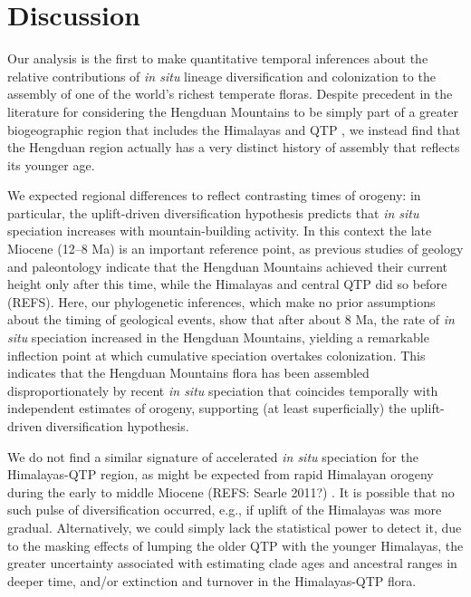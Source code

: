 \section{Discussion}

Our analysis is the first to make quantitative temporal inferences about the relative contributions of \textit{in situ} lineage diversification and colonization to the assembly of one of the world's richest temperate floras. Despite precedent in the literature for considering the Hengduan Mountains to be simply part of a greater biogeographic region that includes the Himalayas and QTP \citep[e.g.][]{Zhang2014,Nie2013,GaoY2013,Matuszak2016}, we instead find that the Hengduan region actually has a very distinct history of assembly that reflects its younger age.

We expected regional differences to reflect contrasting times of orogeny: in particular, the uplift-driven diversification hypothesis predicts that \textit{in situ} speciation increases with mountain-building activity. In this context the late Miocene (12--8 Ma) is an important reference point, as previous studies of geology and paleontology indicate that the Hengduan Mountains achieved their current height only after this time, while the Himalayas and central QTP did so before (REFS). Here, our phylogenetic inferences, which make no prior assumptions about the timing of geological events, show that after about 8 Ma, the rate of \textit{in situ} speciation increased in the Hengduan Mountains, yielding a remarkable inflection point at which cumulative speciation overtakes colonization. This indicates that the Hengduan Mountains flora has been assembled disproportionately by recent \textit{in situ} speciation that coincides temporally with independent estimates of orogeny, supporting (at least superficially) the uplift-driven diversification hypothesis.

We do not find a similar signature of accelerated \textit{in situ} speciation for the Himalayas-QTP region, as might be expected from rapid Himalayan orogeny during the early to middle Miocene (REFS: Searle 2011?)  %
. It is possible that no such pulse of diversification occurred, e.g., if uplift of the Himalayas was more gradual. Alternatively, we could simply lack the statistical power to detect it, due to the masking effects of lumping the older QTP with the younger Himalayas, the greater uncertainty associated with estimating clade ages and ancestral ranges in deeper time, and/or extinction and turnover in the Himalayas-QTP flora.

